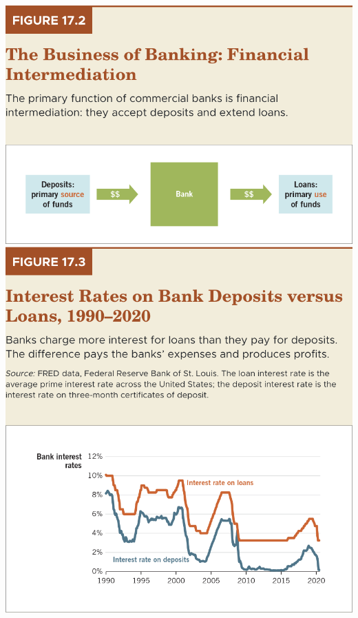 \documentclass[11pt]{article} %
\begin{document}
\begin{center}
\includegraphics[scale=0.5]{../../Chapter 17 Money and the Federal Reserve/Notes/images/Figure 17.2.png}
\includegraphics[scale=0.5]{images/Figure 17.3.png} 
\end{center}
\end{document}
